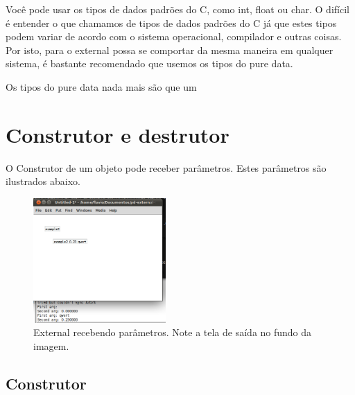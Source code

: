 \documentclass[10pt,a4paper]{report}
\begin{document}
Você pode usar os tipos de dados padrões do C, como int, float ou char. O difícil é entender o que chamamos de tipos de dados padrões do C já que estes tipos podem variar de acordo com o sistema operacional, compilador e outras coisas. Por isto, para o external possa se comportar da mesma maneira em qualquer sistema, é bastante recomendado que usemos os tipos do pure data.

Os tipos do pure data nada mais são que um


\chapter{Construtor e destrutor}

O Construtor de um objeto pode receber parâmetros. Estes parâmetros são ilustrados abaixo.

\begin{figure}[h!]
	\centering
	\includegraphics[height=180]{./images/example2}
	\caption{External recebendo parâmetros. Note a tela de saída no fundo da imagem.}
\end{figure}

\section{Construtor}
\end{document}
